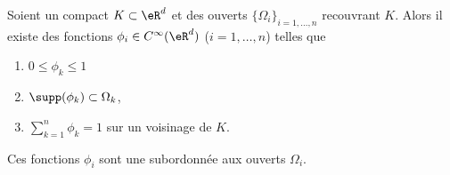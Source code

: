 \begin{theorem}       \label{THOooQFCQooSlgLpz}
    Soient un compact \( K\subset \eR^d\) et des ouverts \( \{ \Omega_i \}_{i=1,\ldots, n}\) recouvrant \( K\). Alors il existe des fonctions \( \phi_i\in  C^{\infty}(\eR^d)\) (\( i=1,\ldots, n\)) telles que
    \begin{enumerate}
        \item
            \( 0\leq \phi_k\leq 1\)
        \item
            \( \supp(\phi_k)\subset \Omega_k\),
        \item
            \( \sum_{k=1}^n\phi_k=1\) sur un voisinage de \( K\).
    \end{enumerate}
    Ces fonctions \( \phi_i\) sont une  subordonnée aux ouverts \( \Omega_i\).
\end{theorem}

